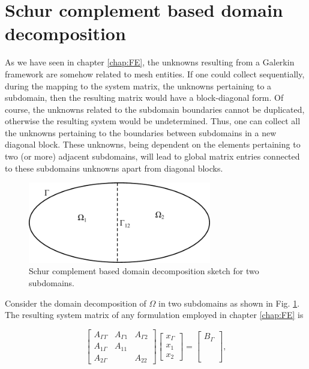 \section{Schur complement based domain decomposition}\label{sec:SchurDD}

As we have seen in chapter \ref{chap:FE}, the unknowns resulting from a Galerkin framework are somehow related to mesh entities. If one could collect sequentially, during the mapping to the system matrix, the unknowns pertaining to a subdomain, then the resulting matrix would have a block-diagonal form. Of course, the unknowns related to the subdomain boundaries cannot be duplicated, otherwise the resulting system would be undetermined. Thus, one can collect all the unknowns pertaining to the boundaries between subdomains in a new diagonal block. These unknowns, being dependent on the elements pertaining to two (or more) adjacent subdomains, will lead to global matrix entries connected to these subdomains unknowns apart from diagonal blocks.

\begin{figure}[ht!]
\centering
\includegraphics[width=8cm]{DDSchur2}
\caption{Schur complement based domain decomposition sketch for two subdomains.}
\label{fig:DDSchur2}
\end{figure}

Consider the domain decomposition of $\Omega$ in two subdomains as shown in Fig. \ref{fig:DDSchur2}. The resulting system matrix of any formulation employed in chapter \ref{chap:FE} is

\begin{equation}
\label{eq:DDSchurFull}
\begin{bmatrix}
A_{\Gamma\Gamma} & A_{\Gamma1} & A_{\Gamma2}\\
A_{1\Gamma} & A_{11} & \\
A_{2\Gamma} &  & A_{22}
\end{bmatrix}
\begin{bmatrix}
x_{\Gamma}\\
x_{1}\\
x_{2}
\end{bmatrix}
=
\begin{bmatrix}
B_{\Gamma}\\
\phantom{B}\\
\phantom{B}
\end{bmatrix},
\end{equation}

